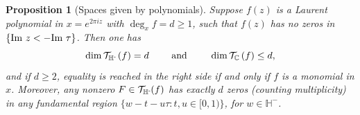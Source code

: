 \documentclass[reqno,11pt]{amsart}
\newtheorem{proposition}[theorem]{Proposition}
\newtheorem{lemma}[theorem]{Lemma}
\theoremstyle{definition}
\theoremstyle{remark}
\numberwithin{equation}{section}
\newcommand{\C}{\mathbb{C}}
\renewcommand{\H}{{\mathbb{H}}}
\newcommand{\Hminus}{{\mathbb{H}^{\textnormal{-}\hspace{-0.03cm}}}}
\newcommand{\mT}{\mathcal{T}}
\renewcommand{\Im}{\textnormal{Im}\ }
\renewcommand{\hat}{\widehat}
\begin{document}

\begin{proposition}[Spaces given by polynomials] \label{prop:polynomial-spaces}
Suppose $f(z)$ is a Laurent polynomial in $x = e^{2\pi i z}$ with $\deg_x f = d \ge 1$, such that $f(z)$ has no zeros in $\{\Im z < -\Im \tau\}$. Then one has
\[
    \dim \mT_\Hminus\left(f \right) = d \qquad \text{ and } \qquad 
    \dim \mT_\C\left(f \right) \le d,
\]
and if $d \ge 2$, equality is reached in the right side if and only if $f$ is a monomial in $x$. Moreover, any nonzero $F \in \mT_\Hminus(f)$ has exactly $d$ zeros (counting multiplicity) in any fundamental region $\{w - t - u\tau : t, u \in [0, 1) \}$, for $w \in \H^-$.
\end{proposition}
\end{document}
